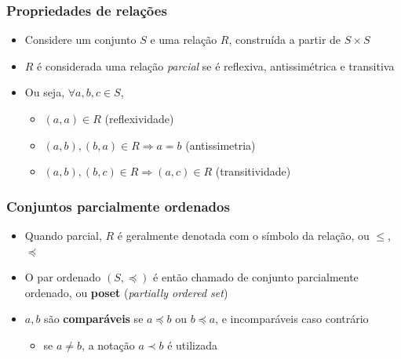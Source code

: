 \documentclass[12pt]{beamer}
\begin{document}
\begin{frame}
  \frametitle{Propriedades de relações}
  \begin{itemize}
    \item Considere um conjunto $S$ e uma relação $R$, construída a partir de
        $S \times S$
    \item $R$ é considerada uma relação \emph{parcial} se é reflexiva,
        antissimétrica e transitiva
    \item<1-> Ou seja, $\forall a, b, c \in S$,
    \begin{itemize}[itemsep=0pt]
      \item<2-> $(a, a) \in R$ (reflexividade)
      \item<3-> $(a, b), (b, a) \in R \Rightarrow a = b$ (antissimetria)
      \item<4-> $(a, b), (b, c) \in R \Rightarrow (a, c) \in R$ (transitividade)
    \end{itemize}
  \end{itemize}
\end{frame}

\begin{frame}
  \frametitle{Conjuntos parcialmente ordenados}
  \begin{itemize}
    \item Quando parcial, $R$ é geralmente denotada com o símbolo da relação,
        ou $\leq$, $\preccurlyeq$
    \item O par ordenado $(S, \preccurlyeq)$ é então chamado de conjunto
        parcialmente ordenado, ou \textbf{poset} (\emph{partially ordered set})
    \item $a, b$ são \textbf{comparáveis} se $a \preccurlyeq b$ ou $b
        \preccurlyeq a$, e incomparáveis caso contrário
    \begin{itemize}
      \item se $a \neq b$, a notação $a \prec b$ é utilizada
    \end{itemize}
  \end{itemize}
\end{frame}
\end{document}
